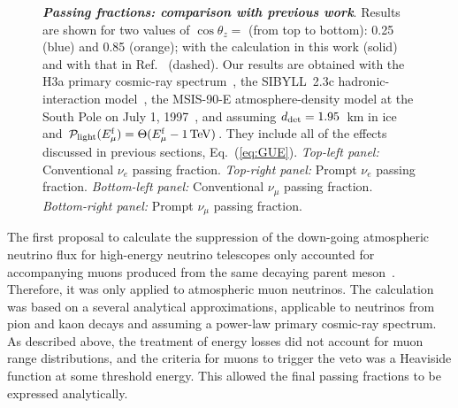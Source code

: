 \documentclass[aps,prd,showpacs,letterpaper,onecolumn,longbibliography,superscriptaddress,notitlepage,nofootinbib]{revtex4-1}%
\newcommand{\Emf}{E_{\mu}^{\rm f}}
\newcommand{\Prob}{{\cal P}}
\begin{document}
\begin{figure}
{    }
\caption{\textbf{\textit{Passing fractions: comparison with previous work}}. Results are shown for two values of $\cos\theta_z =$ (from top to bottom): 0.25 (blue) and 0.85 (orange); with the calculation in this work (solid) and with that in Ref.~\cite{Gaisser:2014bja} (dashed). Our results are obtained with the H3a primary cosmic-ray spectrum~\cite{Gaisser:2011cc}, the SIBYLL~2.3c hadronic-interaction model~\cite{Riehn:2017mfm}, the MSIS-90-E atmosphere-density model at the South Pole on July 1, 1997~\cite{Labitzke:1985, Hedin:1991}, and assuming $d_{\rm det} = 1.95$~km in ice and $\Prob_{\rm light}(\Emf) = \Theta(\Emf - 1\,{\rm TeV})$. They include all of the effects discussed in previous sections, Eq.~(\ref{eq:GUE}). \textit{Top-left panel:} Conventional $\nu_e$ passing fraction. \textit{Top-right panel:} Prompt $\nu_e$ passing fraction. \textit{Bottom-left panel:} Conventional $\nu_\mu$ passing fraction. \textit{Bottom-right panel:} Prompt $\nu_\mu$ passing fraction.} 
\label{fig:nue-passing-comparison-old}
\end{figure}

The first proposal to calculate the suppression of the down-going atmospheric neutrino flux for high-energy neutrino telescopes only accounted for accompanying muons produced from the same decaying parent meson~\cite{Schonert:2008is}. Therefore, it was only applied to atmospheric muon neutrinos. The calculation was based on a several analytical approximations, applicable to neutrinos from pion and kaon decays and assuming a power-law primary cosmic-ray spectrum. As described above, the treatment of energy losses did not account for muon range distributions, and the criteria for muons to trigger the veto was a Heaviside function at some threshold energy. This allowed the final passing fractions to be expressed analytically.
\end{document}
